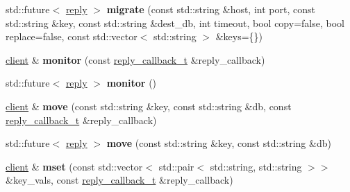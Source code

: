 \begin{DoxyCompactItemize}
\item 
\mbox{\label{classcpp__redis_1_1client_a1bbf11a4ebd3dcf12d9846946e5c3545}} 
std\+::future$<$ \hyperlink{classcpp__redis_1_1reply}{reply} $>$ {\bfseries migrate} (const std\+::string \&host, int port, const std\+::string \&key, const std\+::string \&dest\+\_\+db, int timeout, bool copy=false, bool replace=false, const std\+::vector$<$ std\+::string $>$ \&keys=\{\})
\item 
\mbox{\label{classcpp__redis_1_1client_ad99627cb477d71f07fae0f88ed8ed85b}} 
\hyperlink{classcpp__redis_1_1client}{client} \& {\bfseries monitor} (const \hyperlink{classcpp__redis_1_1client_a061a1140d36d2eaeda82b09a0bb3f9f2}{reply\+\_\+callback\+\_\+t} \&reply\+\_\+callback)
\item 
\mbox{\label{classcpp__redis_1_1client_afd727179e9ee9348ced168a9ac70cbf7}} 
std\+::future$<$ \hyperlink{classcpp__redis_1_1reply}{reply} $>$ {\bfseries monitor} ()
\item 
\mbox{\label{classcpp__redis_1_1client_ad84393d728fb69b527a1d7b009270b58}} 
\hyperlink{classcpp__redis_1_1client}{client} \& {\bfseries move} (const std\+::string \&key, const std\+::string \&db, const \hyperlink{classcpp__redis_1_1client_a061a1140d36d2eaeda82b09a0bb3f9f2}{reply\+\_\+callback\+\_\+t} \&reply\+\_\+callback)
\item 
\mbox{\label{classcpp__redis_1_1client_ab50d18d50ac6d0bb7b91347c3a574960}} 
std\+::future$<$ \hyperlink{classcpp__redis_1_1reply}{reply} $>$ {\bfseries move} (const std\+::string \&key, const std\+::string \&db)
\item 
\mbox{\label{classcpp__redis_1_1client_acd9e2a69abc97bb7735425fdaebe788d}} 
\hyperlink{classcpp__redis_1_1client}{client} \& {\bfseries mset} (const std\+::vector$<$ std\+::pair$<$ std\+::string, std\+::string $>$$>$ \&key\+\_\+vals, const \hyperlink{classcpp__redis_1_1client_a061a1140d36d2eaeda82b09a0bb3f9f2}{reply\+\_\+callback\+\_\+t} \&reply\+\_\+callback)
\item 
\mbox{\label{classcpp__redis_1_1client_a369f84ea90c49095a3222d6f210410f8}} 
$$
\end{DoxyCompactItemize}
